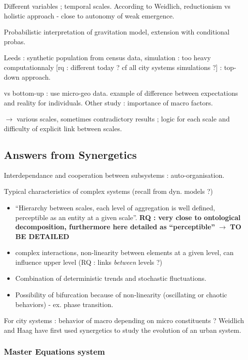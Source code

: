 Different variables ; temporal scales. According to Weidlich, reductionism vs holistic approach - close to autonomy of weak emergence.

Probabilistic interpretation of gravitation model, extension with conditional probas.

Leeds : synthetic population from census data, simulation : too heavy computationnaly [rq : different today ? cf all city systems simulations ?] : top-down approach.

vs bottom-up : use micro-geo data. example of difference between expectations and reality for individuals. Other study : importance of macro factors.

$\rightarrow$ various scales, sometimes contradictory results ; logic for each scale and difficulty of explicit link between scales.


\subsection{Answers from Synergetics}

Interdependance and cooperation between subsystems : auto-organisation.

Typical characteristics of complex systems (recall from dyn. models ?)

\begin{itemize}
\item ``Hierarchy between scales, each level of aggregation is well defined, perceptible as an entity at a given scale''. \textbf{RQ : very close to ontological decomposition, furthermore here detailed as ``perceptible''} $\rightarrow$ \textbf{TO BE DETAILED}
\item complex interactions, non-linearity between elements at a given level, can influence upper level (RQ : links \emph{between} levels ?)
\item Combination of deterministic trends and stochastic fluctuations.
\item Possibility of bifurcation because of non-linearity (oscillating or chaotic behaviors) - ex. phase transition.
\end{itemize}


For city systems : behavior of macro depending on micro constituents ? Weidlich and Haag have first used synergetics to study the evolution of an urban system.

\subsubsection{Master Equations system}

